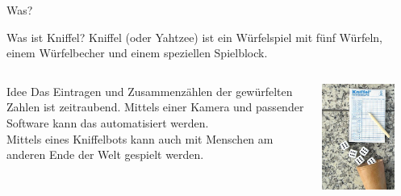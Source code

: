 \documentclass{beamer}
\begin{document}
\begin{frame}{Was?}

\begin{block}{Was ist Kniffel?}
Kniffel (oder Yahtzee) ist ein W\"urfelspiel mit f\"unf W\"urfeln, einem W\"urfelbecher und einem speziellen Spielblock.
\end{block}

\begin{columns}[]
  \begin{column}{0.55\textwidth}
 
    \begin{exampleblock}{Idee}
    \justifying
    Das Eintragen und Zusammenz\"ahlen der gew\"urfelten Zahlen ist zeitraubend. Mittels einer Kamera und passender Software kann das automatisiert werden.\\
    Mittels eines Kniffelbots kann auch mit Menschen am anderen Ende der Welt gespielt werden.
    \end{exampleblock}
	
  \end{column}
  \begin{column}{0.35\textwidth}
  
    \begin{center}
        \includegraphics[width=0.8\textwidth]{fig_kniffel}
    \end{center}
	
  \end{column}
\end{columns}


\end{frame}
\end{document}
